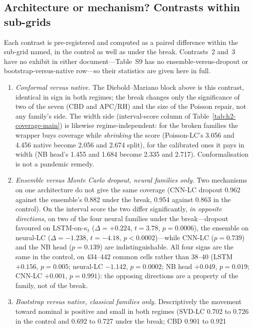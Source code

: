 \subsection{Architecture or mechanism? Contrasts within sub-grids}
\label{sec:results-contrasts}

Each contrast is pre-registered and computed as a paired difference within the
sub-grid named, in the control as well as under the break. Contrasts~2 and~3
have no exhibit in either document---Table~S9 has no ensemble-versus-dropout or
bootstrap-versus-native row---so their statistics are given here in full.

\begin{enumerate}
\item \emph{Conformal versus native.} The Diebold--Mariano block above is this
  contrast, identical in sign in both regimes; the break changes only the
  significance of two of the seven (CBD and APC/RH) and the size of the Poisson
  repair, not any family's side. The width side (interval-score column of
  Table~\ref{tab:h2-coverage-main}) is likewise regime-independent: for the
  broken families the wrapper buys coverage while \emph{shrinking} the score
  (Poisson-LC's 3.056 and 4.456 native become 2.056 and 2.674 split), for the
  calibrated ones it pays in width (NB head's 1.455 and 1.684 become 2.335 and
  2.717). Conformalisation is not a pandemic remedy.
\item \emph{Ensemble versus Monte Carlo dropout, neural families only.} Two
  mechanisms on one architecture do not give the same coverage (CNN-LC dropout
  0.962 against the ensemble's 0.882 under the break, 0.954 against 0.863 in the
  control). On the interval score the two differ significantly, \emph{in
  opposite directions}, on two of the four neural families under the
  break---dropout favoured on LSTM-on-$\kappa_t$ ($\Delta = +0.224$,
  $t = 3.78$, $p = 0.0006$), the ensemble on neural-LC ($\Delta = -1.238$,
  $t = -4.18$, $p < 0.0002$)---while CNN-LC ($p = 0.739$) and the NB head
  ($p = 0.139$) are indistinguishable. All four signs are the same in the
  control, on 434--442 common cells rather than 38--40 (LSTM $+0.156$,
  $p=0.005$; neural-LC $-1.142$, $p=0.0002$; NB head $+0.049$, $p=0.019$;
  CNN-LC $+0.001$, $p=0.991$): the opposing directions are a property of the
  family, not of the break.
\item \emph{Bootstrap versus native, classical families only.} Descriptively the
  movement toward nominal is positive and small in both regimes (SVD-LC 0.702 to
  0.726 in the control and 0.692 to 0.727 under the break; CBD 0.901 to 0.921

\end{enumerate}
